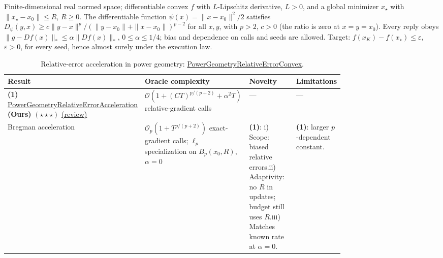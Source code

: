 \begin{table}[tp]
\centering
\caption{Relative-error acceleration in power geometry: \href{https://github.com/k3nfalt/longtails/blob/main/LongTails/Setups/PowerGeometryRelativeErrorConvex.lean}{Power\allowbreak{}Geometry\allowbreak{}Relative\allowbreak{}Error\allowbreak{}Convex}.}\label{tab:PowerGeometryRelativeErrorConvex}
\parbox{\linewidth}{\footnotesize Finite-dimensional real normed space; differentiable convex $f$ with $L$-Lipschitz derivative, $L>0$, and a global minimizer $x_\star$ with $\|x_\star-x_0\|\le R$, $R\ge0$. The differentiable function $\psi(x)=\|x-x_0\|^2/2$ satisfies $D_\psi(y,x)\ge c\|y-x\|^p/(\|y-x_0\|+\|x-x_0\|)^{p-2}$ for all $x,y$, with $p>2$, $c>0$ (the ratio is zero at $x=y=x_0$). Every reply obeys $\|g-Df(x)\|_*\le\alpha\|Df(x)\|_*$, $0\le\alpha\le1/4$; bias and dependence on calls and seeds are allowed. Target: $f(x_K)-f(x_\star)\le\varepsilon$, $\varepsilon>0$, for every seed, hence almost surely under the execution law.}\par\smallskip
\begin{threeparttable}
\footnotesize
\setlength{\tabcolsep}{4pt}\renewcommand{\arraystretch}{1.25}
\begin{tabularx}{\linewidth}{@{}>{\raggedright\arraybackslash}p{0.20\linewidth}>{\raggedright\arraybackslash}p{0.32\linewidth}>{\raggedright\arraybackslash}p{0.25\linewidth}>{\raggedright\arraybackslash}X@{}}
\toprule
\textbf{Result} & \textbf{Oracle complexity} & \textbf{Novelty} & \textbf{Limitations} \\
\midrule
\textbf{(1)} \href{https://github.com/k3nfalt/longtails/blob/main/LongTails/Theorems/PowerGeometryRelativeErrorAcceleration.lean}{Power\allowbreak{}Geometry\allowbreak{}Relative\allowbreak{}Error\allowbreak{}Acceleration} \textbf{(Ours)} $(\star\star\star)$ \href{https://github.com/k3nfalt/longtails/blob/main/scripts/reviews/PowerGeometryRelativeErrorAcceleration.md}{(review)}
& $\mathcal{O}\!\left(1+(CT)^{p/(p+2)}+\alpha^2T\right)$ relative-gradient calls
& --- & --- \\
\midrule[1.2pt]
Bregman acceleration \citep[Cor.~4.10, \S5.1.2]{pgrDGJ2016v3}
& $\mathcal{O}_p\!\left(1+T^{p/(p+2)}\right)$ exact-gradient calls; $\ell_p$ specialization on $B_p(x_0,R)$, $\alpha=0$
& \textbf{(1)}: i) Scope: biased relative errors.\newline ii) Adaptivity: no $R$ in updates; budget still uses $R$.\newline iii) Matches known rate at $\alpha=0$.
& \textbf{(1)}: larger $p$-dependent constant. \\

\end{tabularx}
\end{threeparttable}
\end{table}
